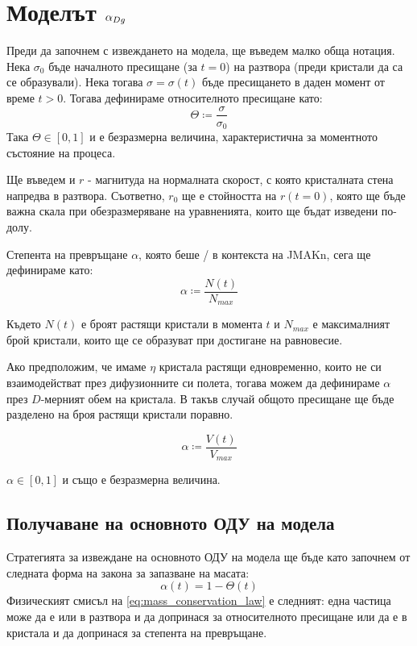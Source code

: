 \section{Моделът \texorpdfstring{$\alpha_{Dg}$}{αDg}} 
Преди да започнем с извеждането на модела, ще въведем малко обща нотация. Нека $\sigma_0$ бъде началното пресищане (за $t = 0 $) на разтвора (преди кристали да са се образували). Нека тогава $\sigma = \sigma(t)$ бъде пресищането в даден момент от време $t > 0$. Тогава дефинираме относителното пресищане като:
\begin{equation*}
	\Theta \coloneqq \frac{\sigma}{\sigma_0}
\end{equation*}
Така $\Theta \in [0,1]$ и е безразмерна величина, характеристична за моментното състояние на процеса.

Ще въведем и $r$  - магнитуда на нормалната скорост, с която кристалната стена напредва в разтвора. Съответно, $r_0$ ще е стойността на $r(t=0)$, която ще бъде важна скала при обезразмеряване на уравненията, които ще бъдат изведени по-долу.

Степента на превръщане $\alpha$, която беше / в контекста на JMAKn, сега ще дефинираме като:
\begin{equation}
	\label{eq:alpha_ndef_def}
	\alpha \coloneqq \frac{N(t)}{N_{max}}
\end{equation}

Където $N(t)$ е броят растящи кристали в момента $t$ и $N_{max}$ е максималният брой кристали, които ще се образуват при достигане на равновесие.

Ако предположим, че имаме $\eta$ кристала растящи едновременно, които не си взаимодействат през дифузионните си полета, тогава можем да дефинираме $\alpha$ през $D$-мерният обем на кристала. В такъв случай общото пресищане ще бъде разделено на броя растящи кристали поравно.

\begin{equation}
	\label{eq:alpha_vol_def}
	\alpha \coloneqq \frac{V(t)}{V_{max}}
\end{equation}

\noindent $\alpha \in [0,1]$ и също е безразмерна величина.

\subsection{Получаване на основното ОДУ на модела}
Стратегията за извеждане на основното ОДУ на модела ще бъде като започнем от следната форма на закона за запазване на масата:
\begin{equation}
	\label{eq:mass_conservation_law}
	\alpha(t) = 1 - \Theta(t)
\end{equation}
\noindent Физическият смисъл на \autoref{eq:mass_conservation_law} е следният: една частица може да е или в разтвора и да допринася за относителното пресищане или да е в кристала и да допринася за степента на превръщане.

